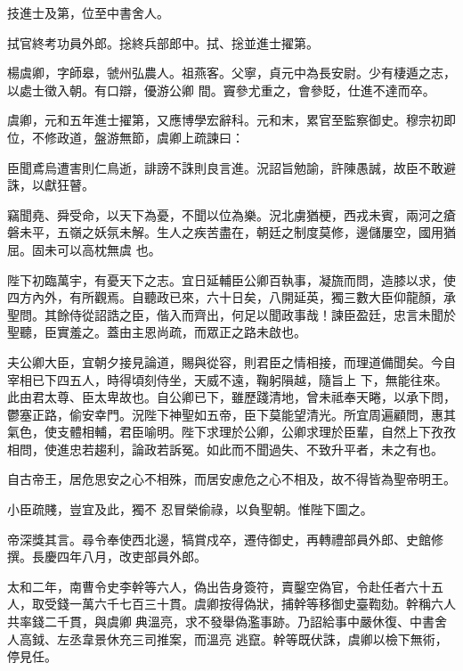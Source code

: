 \begin{pinyinscope}
 技進士及第，位至中書舍人。



 拭官終考功員外郎。捴終兵部郎中。拭、捴並進士擢第。



 楊虞卿，字師皋，虢州弘農人。祖燕客。父寧，貞元中為長安尉。少有棲遁之志，以處士徵入朝。有口辯，優游公卿
 間。竇參尤重之，會參貶，仕進不達而卒。



 虞卿，元和五年進士擢第，又應博學宏辭科。元和末，累官至監察御史。穆宗初即位，不修政道，盤游無節，虞卿上疏諫曰：



 臣聞鳶烏遭害則仁鳥逝，誹謗不誅則良言進。況詔旨勉諭，許陳愚誠，故臣不敢避誅，以獻狂瞽。



 竊聞堯、舜受命，以天下為憂，不聞以位為樂。況北虜猶梗，西戎未賓，兩河之瘡磐未平，五嶺之妖氛未解。生人之疾苦盡在，朝廷之制度莫修，邊儲屢空，國用猶屈。固未可以高枕無虞
 也。



 陛下初臨萬宇，有憂天下之志。宜日延輔臣公卿百執事，凝旒而問，造膝以求，使四方內外，有所觀焉。自聽政已來，六十日矣，八開延英，獨三數大臣仰龍顏，承聖問。其餘侍從詔誥之臣，偕入而齊出，何足以聞政事哉！諫臣盈廷，忠言未聞於聖聽，臣實羞之。蓋由主恩尚疏，而眾正之路未啟也。



 夫公卿大臣，宜朝夕接見論道，賜與從容，則君臣之情相接，而理道備聞矣。今自宰相已下四五人，時得頃刻侍坐，天威不遠，鞠躬隕越，隨旨上
 下，無能往來。此由君太尊、臣太卑故也。自公卿已下，雖歷踐清地，曾未祗奉天睠，以承下問，鬱塞正路，偷安幸門。況陛下神聖如五帝，臣下莫能望清光。所宜周遍顧問，惠其氣色，使支體相輔，君臣喻明。陛下求理於公卿，公卿求理於臣輩，自然上下孜孜相問，使進忠若趨利，論政若訴冤。如此而不聞過失、不致升平者，未之有也。



 自古帝王，居危思安之心不相殊，而居安慮危之心不相及，故不得皆為聖帝明王。



 小臣疏賤，豈宜及此，獨不
 忍冒榮偷祿，以負聖朝。惟陛下圖之。



 帝深獎其言。尋令奉使西北邊，犒賞戍卒，遷侍御史，再轉禮部員外郎、史館修撰。長慶四年八月，改吏部員外郎。



 太和二年，南曹令史李幹等六人，偽出告身簽符，賣鑿空偽官，令赴任者六十五人，取受錢一萬六千七百三十貫。虞卿按得偽狀，捕幹等移御史臺鞫劾。幹稱六人共率錢二千貫，與虞卿典溫亮，求不發舉偽濫事跡。乃詔給事中嚴休復、中書舍人高鉞、左丞韋景休充三司推案，而溫亮
 逃竄。幹等既伏誅，虞卿以檢下無術，停見任。




\end{pinyinscope}
